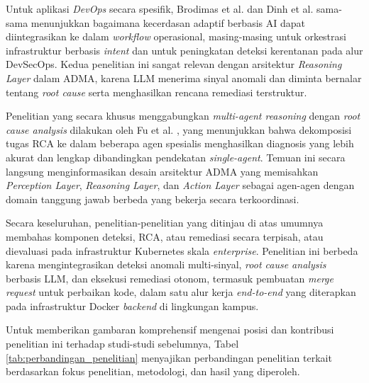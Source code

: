 Untuk aplikasi \textit{DevOps} secara spesifik, Brodimas et al. \cite{brodimas2025intent} dan Dinh et al. \cite{dinh2025enhancing} sama-sama menunjukkan bagaimana kecerdasan adaptif berbasis AI dapat diintegrasikan ke dalam \textit{workflow} operasional, masing-masing untuk orkestrasi infrastruktur berbasis \textit{intent} dan untuk peningkatan deteksi kerentanan pada alur DevSecOps. Kedua penelitian ini sangat relevan dengan arsitektur \textit{Reasoning Layer} dalam ADMA, karena LLM menerima sinyal anomali dan diminta bernalar tentang \textit{root cause} serta menghasilkan rencana remediasi terstruktur.

Penelitian yang secara khusus menggabungkan \textit{multi-agent reasoning} dengan \textit{root cause analysis} dilakukan oleh Fu et al. \cite{fu2025leveraging}, yang menunjukkan bahwa dekomposisi tugas RCA ke dalam beberapa agen spesialis menghasilkan diagnosis yang lebih akurat dan lengkap dibandingkan pendekatan \textit{single-agent}. Temuan ini secara langsung menginformasikan desain arsitektur ADMA yang memisahkan \textit{Perception Layer}, \textit{Reasoning Layer}, dan \textit{Action Layer} sebagai agen-agen dengan domain tanggung jawab berbeda yang bekerja secara terkoordinasi.

Secara keseluruhan, penelitian-penelitian yang ditinjau di atas umumnya membahas komponen deteksi, RCA, atau remediasi secara terpisah, atau dievaluasi pada infrastruktur Kubernetes skala \textit{enterprise}. Penelitian ini berbeda karena mengintegrasikan deteksi anomali multi-sinyal, \textit{root cause analysis} berbasis LLM, dan eksekusi remediasi otonom, termasuk pembuatan \textit{merge request} untuk perbaikan kode, dalam satu alur kerja \textit{end-to-end} yang diterapkan pada infrastruktur Docker \textit{backend} di lingkungan kampus.

Untuk memberikan gambaran komprehensif mengenai posisi dan kontribusi penelitian ini terhadap studi-studi sebelumnya, Tabel \ref{tab:perbandingan_penelitian} menyajikan perbandingan penelitian terkait berdasarkan fokus penelitian, metodologi, dan hasil yang diperoleh.

